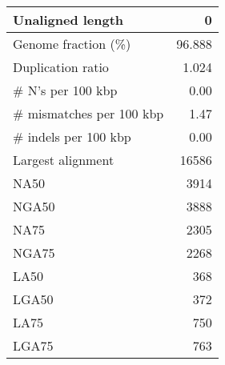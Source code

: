 \documentclass[12pt,a4paper]{article}
\begin{document}
\begin{table}[ht]
\begin{center}
\begin{tabular}{|l*{1}{|r}|}
Unaligned length & 0 \\ \hline
Genome fraction (\%) & 96.888 \\ \hline
Duplication ratio & 1.024 \\ \hline
\# N's per 100 kbp & 0.00 \\ \hline
\# mismatches per 100 kbp & 1.47 \\ \hline
\# indels per 100 kbp & 0.00 \\ \hline
Largest alignment & 16586 \\ \hline
NA50 & 3914 \\ \hline
NGA50 & 3888 \\ \hline
NA75 & 2305 \\ \hline
NGA75 & 2268 \\ \hline
LA50 & 368 \\ \hline
LGA50 & 372 \\ \hline
LA75 & 750 \\ \hline
LGA75 & 763 \\ \hline
\end{tabular}
\end{center}
\end{table}
\end{document}
